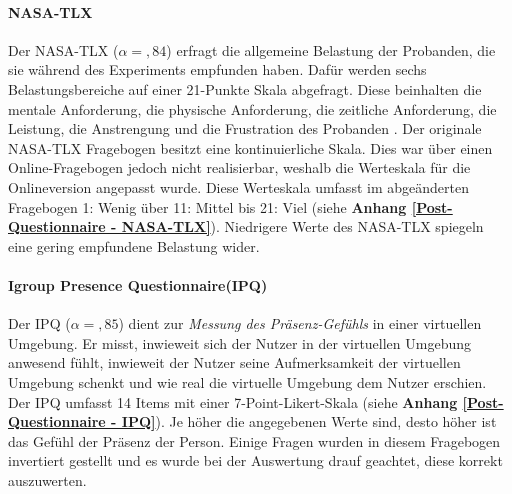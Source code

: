 \documentclass[a4paper,11pt]{article}%
\renewcommand{\\}{\vspace*{0.5\baselineskip} \newline}
\begin{document}
{		\paragraph{NASA-TLX}
Der NASA-TLX ($\alpha =,84$) erfragt die allgemeine Belastung der Probanden, die sie während des Experiments empfunden haben. Dafür werden sechs Belastungsbereiche auf einer 21-Punkte Skala abgefragt. Diese beinhalten die mentale Anforderung, die physische Anforderung, die zeitliche Anforderung, die Leistung, die Anstrengung und die Frustration des Probanden \citep{NASATLX}.
Der originale NASA-TLX Fragebogen besitzt eine kontinuierliche Skala. Dies war über einen Online-Fragebogen jedoch nicht realisierbar, weshalb die Werteskala für die Onlineversion angepasst wurde. Diese Werteskala umfasst im abgeänderten Fragebogen 1: \glqq{}Wenig\dq{} über 11: \glqq{}Mittel\dq{} bis 21: \glqq{}Viel\dq{} (siehe \textbf{Anhang \ref{Post-Questionnaire - NASA-TLX}}). Niedrigere Werte des NASA-TLX spiegeln eine gering empfundene Belastung wider.

		\paragraph{Igroup Presence Questionnaire(IPQ)}
Der IPQ ($\alpha =,85$) dient zur \textit{Messung des Präsenz-Gefühls} in einer virtuellen Umgebung. Er misst, inwieweit sich der Nutzer in der virtuellen Umgebung anwesend fühlt, inwieweit der Nutzer seine Aufmerksamkeit der virtuellen Umgebung schenkt und wie real die virtuelle Umgebung dem Nutzer erschien. Der IPQ umfasst 14 Items mit einer 7-Point-Likert-Skala (siehe \textbf{Anhang \ref{Post-Questionnaire - IPQ}}). Je höher die angegebenen Werte sind, desto höher ist das Gefühl der Präsenz der Person. Einige Fragen wurden in diesem Fragebogen invertiert gestellt und es wurde bei der Auswertung drauf geachtet, diese korrekt auszuwerten.
		
}
\end{document}
